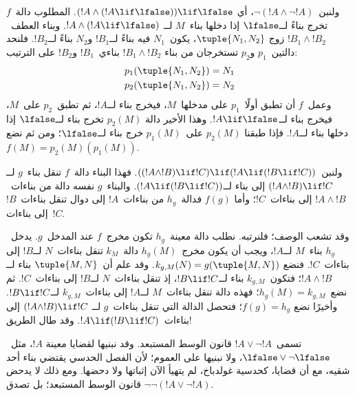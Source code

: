 \documentclass[../../../include/open-logic-section]{subfiles}
\begin{document}
\begin{ex}
ولنبن~$\lnot(!A \land \lnot !A)$، أي
$(!A \land (!A \lif \lfalse)) \lif \lfalse$. المطلوب دالة~$f$ تخرج
بناءً لــ$\lfalse$ إذا دخلها بناء~$M$ لــ
$!A \land (!A \lif \lfalse)$. وبناء العطف~$!B_1 \land !B_2$ زوج
$\tuple{N_1, N_2}$، يكون~$N_1$ فيه بناءً لــ$!B_1$ و$N_2$ بناءً
لــ$!B_2$. فلنحد دالتين~$p_1$ و$p_2$ تستخرجان من بناء
$!B_1 \land !B_2$ بناءي~$!B_1$ و$!B_2$ على الترتيب:
\begin{align*}
  p_1(\tuple{N_1, N_2}) &= N_1\\
  p_2(\tuple{N_1, N_2}) &= N_2
\end{align*}
وعمل~$f$ أن تطبق أولًا~$p_1$ على مدخلها~$M$، فيخرج بناء لــ$!A$، ثم
تطبق~$p_2$ على~$M$، فيخرج بناء لــ$!A \lif \lfalse$. وهذا الأخير دالة
$p_2(M)$ تخرج بناء لــ$\lfalse$ إذا دخلها بناء لــ$!A$. فإذا طبقنا
$p_2(M)$ على~$p_1(M)$ خرج بناء لــ$\lfalse$؛ ومن ثم نضع
$f(M) = p_2(M)(p_1(M))$.
\end{ex}

\begin{ex}
ولنبن~$((!A \land !B) \lif !C) \lif (!A \lif
(!B \lif !C))$. فهذا البناء دالة~$f$ تنقل بناء~$g$ لــ
$(!A \land !B) \lif !C$ إلى بناء لــ$(!A \lif (!B \lif !C))$.
والبناء~$g$ نفسه دالة من بناءات~$!A \land !B$ إلى بناءات~$!C$؛ وأما
$f(g)$ فدالة~$h_g$ من بناءات~$!A$ إلى دوال تنقل بناءات~$!B$ إلى
بناءات~$!C$.

وقد تشعب الوصف؛ فلنرتبه. نطلب دالة معينة~$h_g$ تكون مخرج~$f$ عند
المدخل~$g$. يدخل~$h_g$ بناء~$M$ لــ$!A$، ويجب أن يكون مخرج~$h_g(M)$
دالة~$k_M$ تنقل بناءات~$N$ لــ$!B$ إلى بناءات~$!C$. فنضع
$k_{g,M}(N) = g(\tuple{M, N})$. وقد علم أن~$\tuple{M, N}$ بناء لــ
$!A \land !B$؛ فتكون~$k_{g,M}$ بناء لــ$!B \lif !C$، إذ تنقل بناءات~$N$
لــ$!B$ إلى بناءات~$!C$. ثم نضع~$h_g(M) = k_{g,M}$؛ فهذه دالة تنقل
بناءات~$M$ لــ$!A$ إلى بناءات~$k_{g,M}$ لــ$!B \lif !C$. وأخيرًا نضع
$f(g) = h_g$؛ فتحصل الدالة التي تنقل بناءات~$g$ لــ
$(!A \land !B) \lif !C$ إلى بناءات~$!A \lif (!B \lif !C)$. وقد طال
الطريق!{}
\end{ex}

تسمى~$!A \lor \lnot !A$ قانون الوسط المستبعد. وقد نبنيها لقضايا معينة
$!A$، مثل~$\lfalse \lor \lnot \lfalse$، ولا نبنيها على العموم؛ لأن
الفصل الحدسي يقتضي بناء أحد شقيه، مع أن قضايا، كحدسية غولدباخ، لم يتهيأ
الآن إثباتها ولا دحضها. ومع ذلك لا يدحض قانون الوسط المستبعد؛ بل تصدق
$\lnot \lnot (!A \lor \lnot !A)$.
\end{document}
